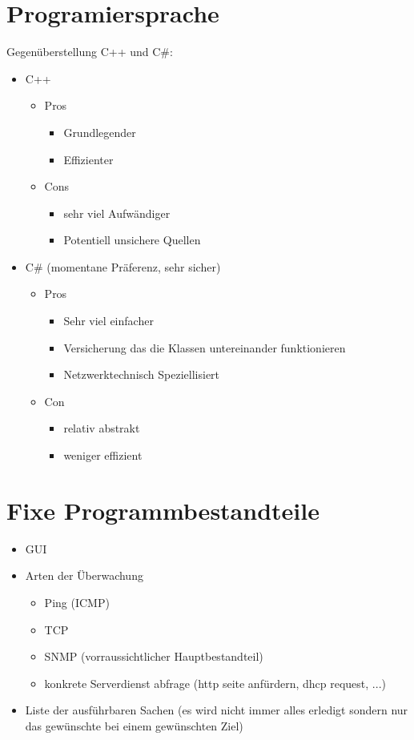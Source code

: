 \documentclass[10pt,a4paper]{report}
\begin{document}
\section{Programiersprache}
Gegenüberstellung C++ und C\#:
\begin{itemize}
\item C++
\begin{itemize}
\item Pros
\begin{itemize}
\item Grundlegender
\item Effizienter
\end{itemize}
\item Cons
\begin{itemize}
\item sehr viel Aufwändiger
\item Potentiell unsichere Quellen
\end{itemize}
\end{itemize}
\item C\# (momentane Präferenz, sehr sicher)
\begin{itemize}
\item Pros
\begin{itemize}
\item Sehr viel einfacher
\item Versicherung das die Klassen untereinander funktionieren
\item Netzwerktechnisch Speziellisiert
\end{itemize}
\item Con
\begin{itemize}
\item relativ abstrakt
\item weniger effizient
\end{itemize}
\end{itemize}
\end{itemize}
\section{Fixe Programmbestandteile}
\begin{itemize}
\item GUI
\item Arten der Überwachung
\begin{itemize}
\item Ping (ICMP)
\item TCP
\item SNMP (vorraussichtlicher Hauptbestandteil)
\item konkrete Serverdienst abfrage (http seite anfürdern, dhcp request, ...)
\end{itemize}
\item Liste der ausführbaren Sachen (es wird nicht immer alles erledigt sondern nur das gewünschte bei einem gewünschten Ziel)
\end{itemize}
\end{document}
